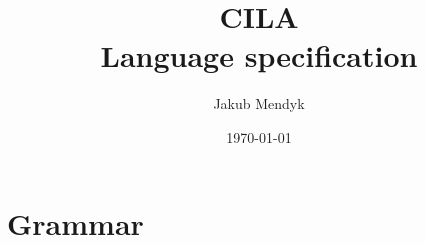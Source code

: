 \documentclass[11pt]{article}
\title{%
\LARGE{\textbf{CILA}} \\
    \Large{Language specification}
}
\author{Jakub Mendyk}
\date{\today}
\begin{document}
\maketitle

\section{Grammar}

\newcommand{\tok}[1]{\textbf{#1}}
\newcommand{\nt}[1]{\textlangle#1\textrangle}

\newcommand{\Program}{\nt{program}}
\newcommand{\Instruction}{\nt{instruction}}

\newcommand{\LogicExpr}{\nt{logic\_expr}}
\newcommand{\LogicSummand}{\nt{logic\_summand}}
\newcommand{\LogicMultiplicand}{\nt{logic\_multiplicand}}
\newcommand{\RelExpr}{\nt{rel\_expr}}
\newcommand{\RelOp}{\nt{rel\_op}}

\newcommand{\ArithExpr}{\nt{arith\_expr}}
\newcommand{\ArithSummand}{\nt{arith\_summand}}
\newcommand{\ArithMultiplicand}{\nt{arith\_multiplicand}}
\newcommand{\SimpleExpr}{\nt{simple\_expr}}
\newcommand{\SummOp}{\nt{summ\_op}}
\newcommand{\MultOp}{\nt{mult\_op}}
\end{document}
